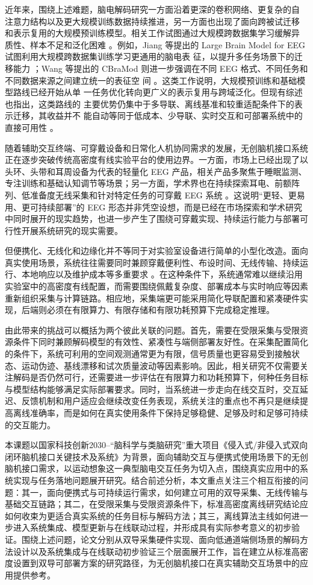 近年来，围绕上述难题，脑电解码研究一方面沿着更深的卷积网络、更复杂的自
注意力结构以及更大规模训练数据持续推进，另一方面也出现了面向跨被试迁移
和表示复用的大规模预训练模型。相关工作试图通过大规模跨数据集学习缓解异
质性、样本不足和泛化困难 \cite{Jia24, Wan24b}。例如，Jiang 等提出的
Large Brain Model for EEG 试图利用大规模跨数据集训练学习更通用的脑电表
征，以提升多任务场景下的迁移能力 \cite{Jia24}；Wang 等提出的 CBraMod
则进一步强调在不同 EEG 格式、不同任务和不同数据来源之间建立统一的表征空
间 \cite{Wan24b}。这类工作说明，大规模预训练和基础模型路线已经开始从单
一任务优化转向更广义的表示复用与跨域泛化。但现有综述也指出，这类路线的
主要优势仍集中于多导联、离线基准和较重适配条件下的表示迁移，其收益并不
能自动等同于低成本、少导联、实时交互和可部署系统中的直接可用性
\cite{Liu26b}。

随着辅助交互终端、可穿戴设备和日常化人机协同需求的发展，无创脑机接口系统正在逐步突破传统高密度有线实验平台的使用边界。一方面，市场上已经出现了以头环、头带和耳周设备为代表的轻量化 EEG 产品，相关产品多聚焦于睡眠监测、专注训练和基础认知调节等场景；另一方面，学术界也在持续探索耳电、前额阵列、低准备度无线采集和针对特定任务的可穿戴 EEG 系统 \cite{He23, Nis22, Arn20, Deb15, Bio22}。这说明“更轻、更易用、更可持续部署”的 EEG 形态并非凭空设想，而是已经在市场探索和学术研究中同时展开的现实趋势，也进一步产生了围绕可穿戴实现、持续运行能力与部署可行性开展系统研究的现实需要。

但便携化、无线化和边缘化并不等同于对实验室设备进行简单的小型化改造。面向真实使用场景，系统往往需要同时兼顾穿戴便利性、布设时间、无线传输、持续运行、本地响应以及维护成本等多重要求 \cite{Cas19c, Nis22, He23}。在这种条件下，系统通常难以继续沿用实验室中的高密度有线配置，而需要围绕佩戴复杂度、部署成本与实时响应等因素重新组织采集与计算链路。相应地，采集端更可能采用简化导联配置和紧凑硬件实现，后端则必须在有限算力、有限存储和有限功耗预算下完成稳定推理。

由此带来的挑战可以概括为两个彼此关联的问题。首先，需要在受限采集与受限资源条件下同时兼顾解码模型的有效性、紧凑性与端侧部署友好性。在采集配置简化的条件下，系统可利用的空间观测通常更为有限，信号质量也更容易受到接触状态、运动伪迹、基线漂移和试次质量波动等因素影响。因此，相关研究不仅需要关注解码是否仍然可行，还需要进一步评估在有限算力和功耗预算下，何种任务目标与模型结构能够满足实际部署要求。同时，当系统进一步走向在线交互时，交互延迟、反馈机制和用户适应会继续改变任务表现，系统关注的重点也不再只是继续提高离线准确率，而是如何在真实使用条件下保持足够稳健、足够及时和足够可持续的交互能力。

本课题以国家科技创新2030--“脑科学与类脑研究”重大项目《侵入式/非侵入式双向闭环脑机接口关键技术及系统》为背景，面向辅助交互与便携式使用场景下的无创脑机接口需求，以运动想象这一典型脑电交互任务为切入点，围绕真实应用中的系统实现与任务落地问题展开研究。结合前述分析，本文重点关注三个相互衔接的问题：其一，面向便携式与可持续运行需求，如何建立可用的双导采集、无线传输与基础交互链路；其二，在受限采集与受限资源条件下，标准高密度离线研究结论应如何收束为更适合真实系统的任务目标与解码方法；其三，离线算法主线如何进一步进入系统集成、模型更新与在线联动过程，并形成具有实际参考意义的初步验证。围绕上述问题，论文分别从双导采集硬件实现、面向低通道端侧场景的解码方法设计以及系统集成与在线联动初步验证三个层面展开工作，旨在建立从标准高密度设置到双导可部署方案的研究路径，为无创脑机接口在真实辅助交互场景中的应用提供参考。

